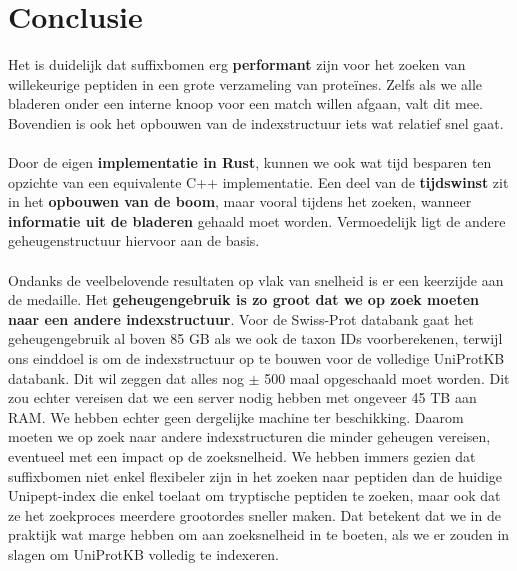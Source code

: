 \section{Conclusie}\label{sec:conclusie-suffix-bomen}
Het is duidelijk dat suffixbomen erg \textbf{performant} zijn voor het zoeken van willekeurige peptiden in een grote verzameling van proteïnes.
Zelfs als we alle bladeren onder een interne knoop voor een match willen afgaan, valt dit mee.
Bovendien is ook het opbouwen van de indexstructuur iets wat relatief snel gaat.
\\ \\
Door de eigen \textbf{implementatie in Rust}, kunnen we ook wat tijd besparen ten opzichte van een equivalente C++ implementatie.
Een deel van de \textbf{tijdswinst} zit in het\textbf{ opbouwen van de boom}, maar vooral tijdens het zoeken, wanneer \textbf{informatie uit de bladeren} gehaald moet worden.
Vermoedelijk ligt de andere geheugenstructuur hiervoor aan de basis.
\\ \\
Ondanks de veelbelovende resultaten op vlak van snelheid is er een keerzijde aan de medaille.
Het \textbf{geheugengebruik is zo groot dat we op zoek moeten naar een andere indexstructuur}.
Voor de Swiss-Prot databank gaat het geheugengebruik al boven 85 GB als we ook de taxon IDs voorberekenen, terwijl ons einddoel is om de indexstructuur op te bouwen voor de volledige UniProtKB databank.
Dit wil zeggen dat alles nog $\pm$ 500 maal opgeschaald moet worden.
Dit zou echter vereisen dat we een server nodig hebben met ongeveer 45 TB aan RAM\@.
We hebben echter geen dergelijke machine ter beschikking.
Daarom moeten we op zoek naar andere indexstructuren die minder geheugen vereisen, eventueel met een impact op de zoeksnelheid.
We hebben immers gezien dat suffixbomen niet enkel flexibeler zijn in het zoeken naar peptiden dan de huidige Unipept-index die enkel toelaat om tryptische peptiden te zoeken, maar ook dat ze het zoekproces meerdere grootordes sneller maken.
Dat betekent dat we in de praktijk wat marge hebben om aan zoeksnelheid in te boeten, als we er zouden in slagen om UniProtKB volledig te indexeren.
